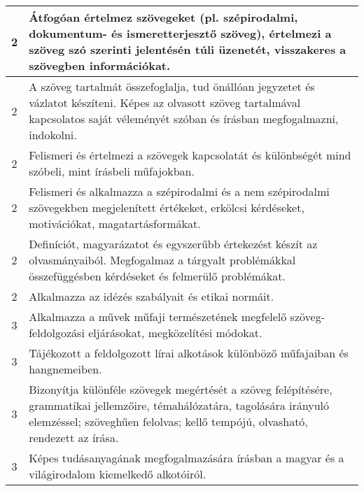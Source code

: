 \begin{longtable}{c | p{12cm} }
                                
                                          2 &  Átfogóan értelmez szövegeket (pl. szépirodalmi, dokumentum- és ismeretterjesztő szöveg), értelmezi a szöveg szó szerinti jelentésén túli üzenetét, visszakeres a szövegben információkat. \\ \hline
                                          2 &  A szöveg tartalmát összefoglalja, tud önállóan jegyzetet és vázlatot készíteni. Képes az olvasott szöveg tartalmával kapcsolatos saját véleményét szóban és írásban megfogalmazni, indokolni. \\ \hline
                                          2 &  Felismeri és értelmezi a szövegek kapcsolatát és különbségét mind szóbeli, mint írásbeli műfajokban. \\ \hline
                                          2 &  Felismeri és alkalmazza a szépirodalmi és a nem szépirodalmi szövegekben megjelenített értékeket, erkölcsi kérdéseket, motivációkat, magatartásformákat. \\ \hline
                                          2 &  Definíciót, magyarázatot és egyszerűbb értekezést készít az olvasmányaiból. Megfogalmaz a tárgyalt problémákkal összefüggésben kérdéseket és felmerülő problémákat. \\ \hline
                                          2 &  Alkalmazza az idézés szabályait és etikai normáit. \\ \hline
                                      
                                
                                          3 &  Alkalmazza a művek műfaji természetének megfelelő szöveg-feldolgozási eljárásokat, megközelítési módokat. \\ \hline
                                          3 &  Tájékozott a feldolgozott lírai alkotások különböző műfajaiban és hangnemeiben. \\ \hline
                                          3 &  Bizonyítja különféle szövegek megértését a szöveg felépítésére, grammatikai jellemzőire, témahálózatára, tagolására irányuló elemzéssel; szöveghűen felolvas; kellő tempójú, olvasható, rendezett az írása.  \\ \hline
                                          3 &  Képes tudásanyagának megfogalmazására írásban a magyar és a világirodalom kiemelkedő alkotóiról. \\ \hline
                                      

\end{longtable}
